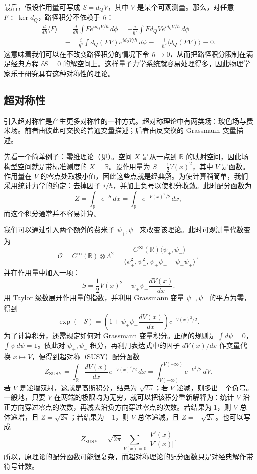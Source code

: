最后，假设作用量可写成 $S=d_QV$，其中 $V$ 是某个可观测量。那么，对任意 $F\in\ker d_Q$，路径积分不依赖于 $\hbar$：
\begin{align*}
  \frac{d}{d\hbar}\langle F\rangle
  &=\frac{d}{d\hbar}\int F e^{i d_QV/\hbar}\,d\phi
   =-\frac{i}{\hbar^2}\int Fd_QV e^{i d_QV/\hbar}\,d\phi\\
  &=-\frac{i}{\hbar^2}\int d_Q(FV)e^{i d_QV/\hbar}\,d\phi
   =-\frac{i}{\hbar^2}\langle d_Q(FV)\rangle=0.
\end{align*}
这意味着我们可以在不改变路径积分的情况下令 $\hbar\to0$，从而把路径积分限制在满足经典方程 $\delta S=0$ 的解空间上。这样量子力学系统就容易处理得多，因此物理学家乐于研究具有这种对称性的理论。

\subsection{超对称性}
引入超对称性是产生更多对称性的一种方式。超对称理论中有两类场：玻色场与费米场。前者由彼此可交换的普通变量描述；后者由反交换的 Grassmann 变量描述。

先看一个简单例子：零维理论（见）。空间 $X$ 是从一点到 $\mathbb R$ 的映射空间，因此场构型空间就是带标准测度的 $X=\mathbb R$。设作用量为 $S=\frac12V(x)^2$，其中 $V$ 是函数。作用量在 $V$ 的零点处取极小值，因此这些点就是经典解。为使计算稍简单，我们采用统计力学的约定：去掉因子 $i/\hbar$，并加上负号以使积分收敛。此时配分函数为
\[
  Z=\int_{\mathbb R}e^{-S}\,dx
   =\int_{\mathbb R}e^{-V(x)^2/2}\,dx,
\]
而这个积分通常并不容易计算。

我们可以通过引入两个额外的费米子 $\psi_+,\psi_-$ 来改变该理论。此时可观测量代数变为
\[
  \mathcal O=C^\infty(\mathbb R)\otimes\Lambda^2
  =\frac{C^\infty(\mathbb R)\langle\psi_+,\psi_-\rangle}
  {\langle\psi_+^2,\psi_-^2,\psi_+\psi_-+\psi_-\psi_+\rangle},
\]
并在作用量中加入一项：
\[
  S=\frac12V(x)^2-\psi_+\psi_-\frac{dV(x)}{dx}.
\]
用 Taylor 级数展开作用量的指数，并利用 Grassmann 变量 $\psi_+,\psi_-$ 的平方为零，得到
\[
  \exp(-S)=\left(1+\psi_+\psi_-\frac{dV(x)}{dx}\right)e^{-V(x)^2/2}.
\]
为了计算积分，还需规定如何对 Grassmann 变量积分。正确的规则是 $\int d\psi=0$，$\int\psi\,d\psi=1$。依此对 $\psi_+,\psi_-$ 积分，再利用表达式中的因子 $dV(x)/dx$ 作变量代换 $x\mapsto V$，便得到超对称（SUSY）配分函数
\[
  Z_{\mathrm{SUSY}}=\int_{\mathbb R}\frac{dV(x)}{dx}e^{-V(x)^2/2}\,dx
  =\int_{V(-\infty)}^{V(+\infty)}e^{-V^2/2}\,dV.
\]
若 $V$ 是递增双射，这就是高斯积分，结果为 $\sqrt{2\pi}$；若 $V$ 递减，则多出一个负号。一般地，只要 $V$ 在两端的极限均为无穷，就可以把该积分重新解释为：统计 $V$ 沿正方向穿过零点的次数，再减去沿负方向穿过零点的次数。若结果为 $1$，则 $V$ 总体递增，且 $Z=\sqrt{2\pi}$；若结果为 $-1$，则 $V$ 总体递减，且 $Z=-\sqrt{2\pi}$。也可以写成
\[
  Z_{\mathrm{SUSY}}=\sqrt{2\pi}
  \sum_{V(x)=0}\frac{V'(x)}{|V'(x)|}.
\]
所以，原理论的配分函数可能很复杂，而超对称理论的配分函数只是对经典解作带符号计数。

